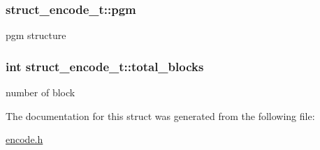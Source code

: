 \subsubsection[{pgm}]{ struct\+\_\+encode\+\_\+t\+::pgm}\label{structstruct__encode__t_abd97350bcc97312570121508eb4371aa}
pgm structure \hypertarget{structstruct__encode__t_ae5a99f2c42d5597f69c3fd9042feca5f}{}
\subsubsection[{total\+\_\+blocks}]{\setlength{\rightskip}{0pt plus 5cm}int struct\+\_\+encode\+\_\+t\+::total\+\_\+blocks}\label{structstruct__encode__t_ae5a99f2c42d5597f69c3fd9042feca5f}
number of block 

The documentation for this struct was generated from the following file\+:\begin{DoxyCompactItemize}
\item 
\hyperlink{encode_8h}{encode.\+h}\end{DoxyCompactItemize}
